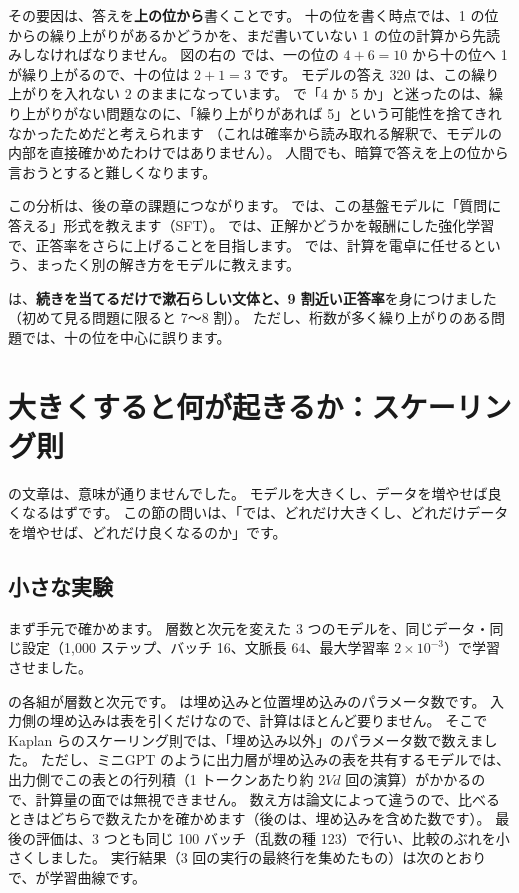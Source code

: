 その要因は、答えを\textbf{上の位から}書くことです。
十の位を書く時点では、1 の位からの繰り上がりがあるかどうかを、まだ書いていない 1 の位の計算から先読みしなければなりません。
図の右の  では、一の位の $4+6=10$ から十の位へ 1 が繰り上がるので、十の位は $2+1=3$ です。
モデルの答え 320 は、この繰り上がりを入れない $2$ のままになっています。
 で「4 か 5 か」と迷ったのは、繰り上がりがない問題なのに、「繰り上がりがあれば 5」という可能性を捨てきれなかったためだと考えられます
（これは確率から読み取れる解釈で、モデルの内部を直接確かめたわけではありません）。
人間でも、暗算で答えを上の位から言おうとすると難しくなります。

この分析は、後の章の課題につながります。
では、この基盤モデルに「質問に答える」形式を教えます（SFT）。
では、正解かどうかを報酬にした強化学習で、正答率をさらに上げることを目指します。
では、計算を電卓に任せるという、まったく別の解き方をモデルに教えます。

 は、\textbf{続きを当てるだけで漱石らしい文体と、9 割近い正答率}を身につけました（初めて見る問題に限ると 7〜8 割）。
ただし、桁数が多く繰り上がりのある問題では、十の位を中心に誤ります。

\section{大きくすると何が起きるか：スケーリング則}\label{sec:pt-scaling}

 の文章は、意味が通りませんでした。
モデルを大きくし、データを増やせば良くなるはずです。
この節の問いは、「では、どれだけ大きくし、どれだけデータを増やせば、どれだけ良くなるのか」です。

\subsection{小さな実験}

まず手元で確かめます。
層数と次元を変えた 3 つのモデルを、同じデータ・同じ設定（1,000 ステップ、バッチ 16、文脈長 64、最大学習率 $2\times10^{-3}$）で学習させました。


 の各組が層数と次元です。
 は埋め込みと位置埋め込みのパラメータ数です。
入力側の埋め込みは表を引くだけなので、計算はほとんど要りません。
そこで Kaplan らのスケーリング則では、「埋め込み以外」のパラメータ数で数えました\cite{kaplan2020scaling}。
ただし、ミニGPT のように出力層が埋め込みの表を共有するモデルでは、出力側でこの表との行列積（1 トークンあたり約 $2Vd$ 回の演算）がかかるので、計算量の面では無視できません。
数え方は論文によって違うので、比べるときはどちらで数えたかを確かめます（後のは、埋め込みを含めた数です）。
最後の評価は、3 つとも同じ 100 バッチ（乱数の種 123）で行い、比較のぶれを小さくしました。
実行結果（3 回の実行の最終行を集めたもの）は次のとおりで、が学習曲線です。

